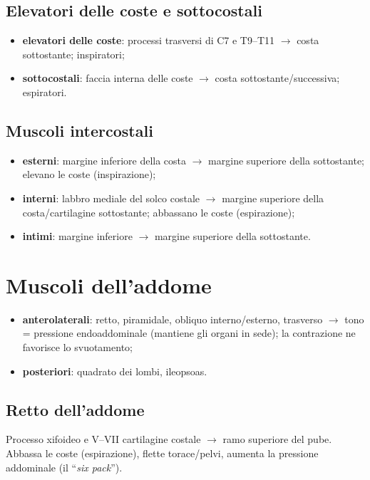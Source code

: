 \subsection{Elevatori delle coste e sottocostali}
\begin{itemize}
  \item \textbf{elevatori delle coste}: processi trasversi di C7 e T9--T11 $\rightarrow$ costa
    sottostante; inspiratori;
  \item \textbf{sottocostali}: faccia interna delle coste $\rightarrow$ costa sottostante/successiva;
    espiratori.
\end{itemize}

\subsection{Muscoli intercostali}
\begin{itemize}
  \item \textbf{esterni}: margine inferiore della costa $\rightarrow$ margine superiore della
    sottostante; elevano le coste (inspirazione);
  \item \textbf{interni}: labbro mediale del solco costale $\rightarrow$ margine superiore della
    costa/cartilagine sottostante; abbassano le coste (espirazione);
  \item \textbf{intimi}: margine inferiore $\rightarrow$ margine superiore della sottostante.
\end{itemize}

\section{Muscoli dell'addome}

\begin{itemize}
  \item \textbf{anterolaterali}: retto, piramidale, obliquo interno/esterno, trasverso
    $\rightarrow$ tono = pressione endoaddominale (mantiene gli organi in sede); la contrazione ne
    favorisce lo svuotamento;
  \item \textbf{posteriori}: quadrato dei lombi, ileopsoas.
\end{itemize}

\subsection{Retto dell'addome}
Processo xifoideo e V--VII cartilagine costale $\rightarrow$ ramo superiore del pube. Abbassa le
coste (espirazione), flette torace/pelvi, aumenta la pressione addominale (il ``\textit{six pack}'').

